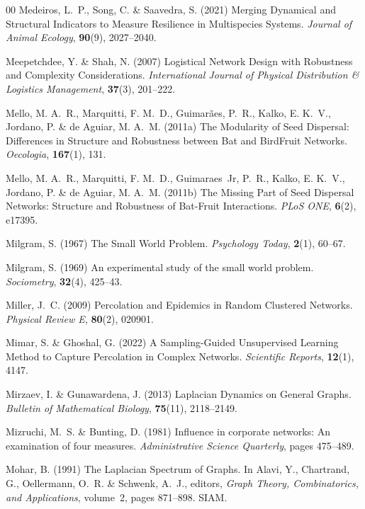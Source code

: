 \documentclass{comnet-mod}
\begin{document}
\begin{thebibliography}{00}
Medeiros, L.~P., Song, C. {\&} Saavedra, S. (2021)  {Merging Dynamical and
  Structural Indicators to Measure Resilience in Multispecies Systems}. {\em
  {Journal of Animal Ecology}}, \textbf{90}(9), 2027--2040.

Meepetchdee, Y. {\&} Shah, N. (2007)  {Logistical Network Design with
  Robustness and Complexity Considerations}. {\em {International Journal of
  Physical Distribution \& Logistics Management}}, \textbf{37}(3), 201--222.

Mello, M. A.~R., Marquitti, F. M.~D., Guimar{\~a}es, P.~R., Kalko, E. K.~V.,
  Jordano, P. {\&} {de Aguiar}, M. A.~M. (2011a)  {The Modularity of Seed
  Dispersal: {{Differences}} in Structure and Robustness between Bat\textendash
  and Bird\textendash Fruit Networks}. {\em {Oecologia}}, \textbf{167}(1), 131.

Mello, M. A.~R., Marquitti, F. M.~D., Guimaraes~Jr, P.~R., Kalko, E. K.~V.,
  Jordano, P. {\&} {de Aguiar}, M. A.~M. (2011b)  {The Missing Part of Seed
  Dispersal Networks: {{Structure}} and Robustness of Bat-Fruit Interactions}.
  {\em {PLoS ONE}}, \textbf{6}(2), e17395.

Milgram, S. (1967)  {The Small World Problem}. {\em {Psychology Today}},
  \textbf{2}(1), 60--67.

Milgram, S. (1969)  An experimental study of the small world problem. {\em
  {Sociometry}}, \textbf{32}(4), 425--43.

Miller, J.~C. (2009)  {Percolation and Epidemics in Random Clustered Networks}.
  {\em {Physical Review E}}, \textbf{80}(2), 020901.

Mimar, S. {\&} Ghoshal, G. (2022)  {A Sampling-Guided Unsupervised Learning
  Method to Capture Percolation in Complex Networks}. {\em {Scientific
  Reports}}, \textbf{12}(1), 4147.

Mirzaev, I. {\&} Gunawardena, J. (2013)  {Laplacian Dynamics on General
  Graphs}. {\em {Bulletin of Mathematical Biology}}, \textbf{75}(11),
  2118--2149.

Mizruchi, M.~S. {\&} Bunting, D. (1981)  {Influence in corporate networks: An
  examination of four measures}. {\em {Administrative Science Quarterly}},
  pages 475--489.

Mohar, B. (1991)  {The {{Laplacian}} Spectrum of Graphs}. In Alavi, Y.,
  Chartrand, G., Oellermann, O.~R. {\&} Schwenk, A.~J., editors, {\em {Graph
  Theory, Combinatorics, and Applications}}, volume~2, pages 871--898. {SIAM}.


\end{thebibliography}
\end{document}
